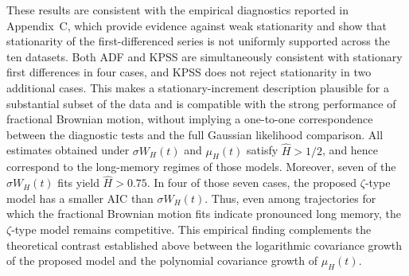 \documentclass[preprint,12pt,authoryear]{elsarticle}
\begin{document}
These results are consistent with the empirical diagnostics reported
in Appendix~C, which provide evidence against weak stationarity
and show that stationarity of the first-differenced series is not
uniformly supported across the ten datasets. Both ADF and KPSS are
simultaneously consistent with stationary first differences in four cases,
and KPSS does not reject stationarity in two additional cases. This makes a
stationary-increment description plausible for a substantial subset of the
data and is compatible with the strong performance of fractional Brownian
motion, without implying a one-to-one correspondence between the diagnostic
tests and the full Gaussian likelihood comparison. All estimates obtained
under \(\sigma W_H(t)\) and \(\mu_H(t)\) satisfy
\(\widehat{H}>1/2\), and hence correspond to the long-memory regimes of
those models. Moreover, seven of the \(\sigma W_H(t)\) fits yield
\(\widehat{H}>0.75\). In four of those seven cases, the proposed
\(\zeta\)-type model has a smaller AIC than \(\sigma W_H(t)\).
Thus, even among trajectories for which the fractional Brownian motion
fits indicate pronounced long memory, the \(\zeta\)-type model remains
competitive. This empirical finding complements the theoretical contrast
established above between the logarithmic covariance growth of the proposed
model and the polynomial covariance growth of \(\mu_H(t)\).
\end{document}
